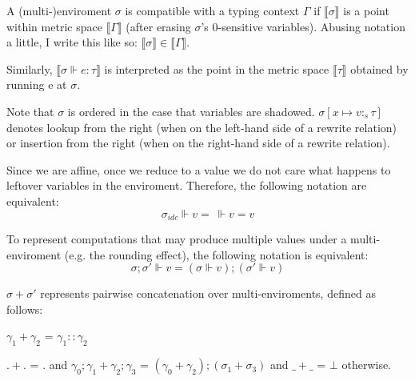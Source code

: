 
A (multi-)enviroment $\sigma$ is compatible with a typing context $\Gamma$ if
$\llbracket \sigma \rrbracket$ is a point within metric space $\llbracket \Gamma
\rrbracket$ (after erasing $\sigma$'s $0$-sensitive variables). Abusing notation
a little, I write this like so: $\llbracket \sigma \rrbracket \in \llbracket
\Gamma \rrbracket$.


Similarly, $\llbracket \sigma \Vdash e : \tau \rrbracket$ is
interpreted as the point in the metric space $\llbracket \tau \rrbracket$
obtained by running e at $\sigma$.

Note that $\sigma$ is ordered in the case that variables are shadowed. $\sigma[x
\mapsto v :_s \tau]$ denotes lookup from the right (when on the left-hand side
of a rewrite relation) or insertion from the right (when on the right-hand side
of a rewrite relation).

Since we are affine, once we reduce to a value we do not care what happens to
leftover variables in the enviroment. Therefore, the following notation are
equivalent:
$$
\sigma_{idc} \Vdash v = \ \Vdash v = v
$$

To represent computations that may produce multiple values under a
multi-enviroment (e.g. the rounding effect), the following notation is
equivalent:
$$
\sigma; \sigma' \Vdash v = (\sigma \Vdash v); (\sigma' \Vdash v)
$$



$\sigma + \sigma'$ represents pairwise concatenation over multi-enviroments,
defined as follows:

\begin{definition}
  $\gamma_1 + \gamma_2$ = $\gamma_1 :: \gamma_2 $
\end{definition}

\begin{definition}
  $. + .$ = $ . $ and $\gamma_0;\gamma_1 + \gamma_2;\gamma_3$ = $(\gamma_0 +
  \gamma_2);(\sigma_1 + \sigma_3)$ and $\_ + \_$ = $\bot$ otherwise.
\end{definition}

